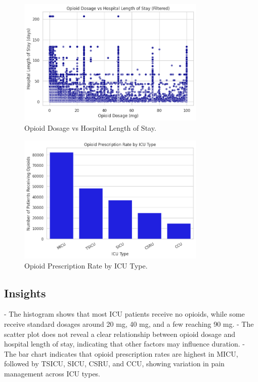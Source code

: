 \documentclass[a4paper,10pt]{article}
\begin{document}
\begin{figure}[H]
    \centering
    \includegraphics[width=0.8\textwidth]{figure5b.png}
    \caption{Opioid Dosage vs Hospital Length of Stay.}
    \label{fig:opioid_vs_stay}
\end{figure}

\begin{figure}[H]
    \centering
    \includegraphics[width=0.8\textwidth]{figure5c.png}
    \caption{Opioid Prescription Rate by ICU Type.}
    \label{fig:opioid_prescription_rate}
\end{figure}



\subsection{Insights}
- The histogram shows that most ICU patients receive no opioids, while some receive standard dosages around 20 mg, 40 mg, and a few reaching 90 mg.
- The scatter plot does not reveal a clear relationship between opioid dosage and hospital length of stay, indicating that other factors may influence duration.
- The bar chart indicates that opioid prescription rates are highest in MICU, followed by TSICU, SICU, CSRU, and CCU, showing variation in pain management across ICU types.
\clearpage
\end{document}
